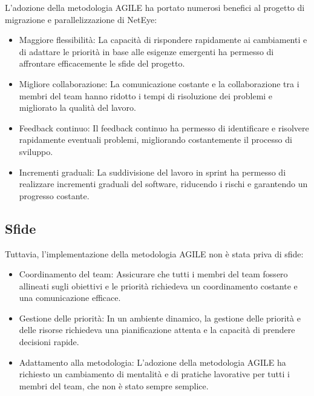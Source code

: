L'adozione della metodologia AGILE ha portato numerosi benefici al progetto di
migrazione e parallelizzazione di NetEye:
\begin{itemize}
  \item Maggiore flessibilità: La capacità di rispondere rapidamente ai
    cambiamenti e di adattare le priorità in base alle esigenze emergenti ha
    permesso di affrontare efficacemente le sfide del progetto.

  \item Migliore collaborazione: La comunicazione costante e la collaborazione
    tra i membri del team hanno ridotto i tempi di risoluzione dei problemi e
    migliorato la qualità del lavoro.

  \item Feedback continuo: Il feedback continuo ha permesso di identificare e
    risolvere rapidamente eventuali problemi, migliorando costantemente il processo
    di sviluppo.

  \item Incrementi graduali: La suddivisione del lavoro in sprint ha permesso di
    realizzare incrementi graduali del software, riducendo i rischi e garantendo
    un progresso costante.
\end{itemize}

\subsection{Sfide}
\label{sub:sfide}

Tuttavia, l'implementazione della metodologia AGILE non è stata priva di sfide:
\begin{itemize}
  \item Coordinamento del team: Assicurare che tutti i membri del team fossero
    allineati sugli obiettivi e le priorità richiedeva un coordinamento costante
    e una comunicazione efficace.

  \item Gestione delle priorità: In un ambiente dinamico, la gestione delle priorità
    e delle risorse richiedeva una pianificazione attenta e la capacità di prendere
    decisioni rapide.

  \item Adattamento alla metodologia: L'adozione della metodologia AGILE ha
    richiesto un cambiamento di mentalità e di pratiche lavorative per tutti i
    membri del team, che non è stato sempre semplice.
\end{itemize}